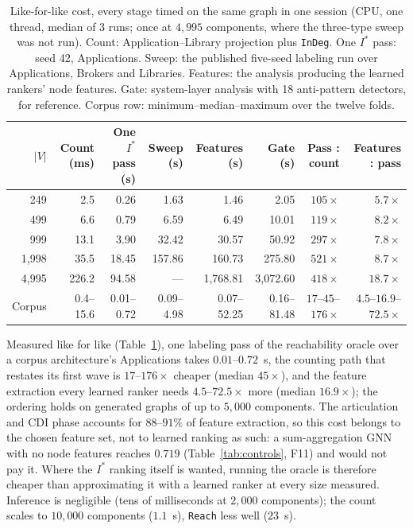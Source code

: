 \documentclass[preprint,3p]{elsarticle}
\begin{document}
\begin{table}[htbp]
\centering
\footnotesize
\setlength{\tabcolsep}{3pt}
\caption{Like-for-like cost, every stage timed on the same graph in one session (CPU, one thread, median of 3 runs; once at $4{,}995$ components, where the three-type sweep was not run). Count: Application--Library projection plus \texttt{InDeg}. One $I^*$ pass: seed 42, Applications. Sweep: the published five-seed labeling run over Applications, Brokers and Libraries. Features: the analysis producing the learned rankers' node features. Gate: system-layer analysis with 18 anti-pattern detectors, for reference. Corpus row: minimum--median--maximum over the twelve folds.}
\label{tab:cost-ll}
\begin{tabular}{rrrrrrrr}
\toprule
$|V|$ & Count (ms) & One $I^*$ pass (s) & Sweep (s) & Features (s) & Gate (s) & Pass : count & Features : pass \\
\midrule
249 & 2.5 & 0.26 & 1.63 & 1.46 & 2.05 & $105\times$ & $5.7\times$ \\
499 & 6.6 & 0.79 & 6.59 & 6.49 & 10.01 & $119\times$ & $8.2\times$ \\
999 & 13.1 & 3.90 & 32.42 & 30.57 & 50.92 & $297\times$ & $7.8\times$ \\
1{,}998 & 35.5 & 18.45 & 157.86 & 160.73 & 275.80 & $521\times$ & $8.7\times$ \\
4{,}995 & 226.2 & 94.58 & --- & 1{,}768.81 & 3{,}072.60 & $418\times$ & $18.7\times$ \\
\midrule
Corpus & 0.4--15.6 & 0.01--0.72 & 0.09--4.98 & 0.07--52.25 & 0.16--81.48 & $17$--$45$--$176\times$ & $4.5$--$16.9$--$72.5\times$ \\
\bottomrule
\end{tabular}
\end{table}

Measured like for like (Table~\ref{tab:cost-ll}), one labeling pass of the reachability oracle over a corpus architecture's Applications takes $0.01$--$0.72$~s, the counting path that restates its first wave is $17$--$176\times$ cheaper (median $45\times$), and the feature extraction every learned ranker needs $4.5$--$72.5\times$ more (median $16.9\times$); the ordering holds on generated graphs of up to $5{,}000$ components. The articulation and CDI phase accounts for $88$--$91\%$ of feature extraction, so this cost belongs to the chosen feature set, not to learned ranking as such: a sum-aggregation GNN with no node features reaches $0.719$ (Table~\ref{tab:controls}, F11) and would not pay it. Where the $I^*$ ranking itself is wanted, running the oracle is therefore cheaper than approximating it with a learned ranker at every size measured. Inference is negligible (tens of milliseconds at $2{,}000$ components); the count scales to $10{,}000$ components ($1.1$~s), \texttt{Reach} less well ($23$~s).
\end{document}
